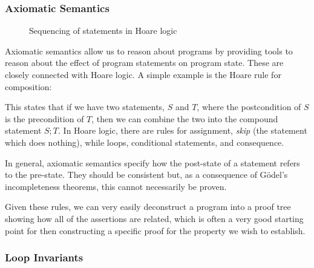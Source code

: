 \subsubsection{Axiomatic Semantics}
\label{sec:lit-verification-embedding-axioms}

\begin{figure}[t]
  \centering
  \begin{prooftree}
  \end{prooftree}
  \caption{Sequencing of statements in Hoare logic}
  \label{fig:exmpl:lit-embedding-sequencing}
\end{figure}

Axiomatic semantics allow us to reason about programs by providing
tools to reason about the effect of program statements on program
state\cite{Hoare69}. These are closely connected with Hoare logic. A
simple example is the Hoare rule for composition:

\begin{prooftree}
\end{prooftree}

This states that if we have two statements, $S$ and $T$, where the
postcondition of $S$ is the precondition of $T$, then we can combine
the two into the compound statement $S;T$\cite{Hoare69}. In Hoare
logic, there are rules for assignment, \textit{skip} (the statement
which does nothing), while loops, conditional statements, and
consequence.

In general, axiomatic semantics specify how the post-state of a
statement refers to the pre-state. They should be consistent but, as
a consequence of G{\"o}del's incompleteness theorems, this cannot
necessarily be proven.

Given these rules, we can very easily deconstruct a program into a
proof tree showing how all of the assertions are related, which is
often a very good starting point for then constructing a specific
proof for the property we wish to establish.

\subsubsection{Loop Invariants}
\label{sec:lit-verification-embedding-invariants}

